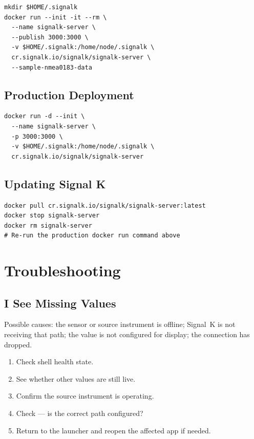 \begin{lstlisting}
mkdir $HOME/.signalk
docker run --init -it --rm \
  --name signalk-server \
  --publish 3000:3000 \
  -v $HOME/.signalk:/home/node/.signalk \
  cr.signalk.io/signalk/signalk-server \
  --sample-nmea0183-data
\end{lstlisting}

\section{Production Deployment}

\begin{lstlisting}
docker run -d --init \
  --name signalk-server \
  -p 3000:3000 \
  -v $HOME/.signalk:/home/node/.signalk \
  cr.signalk.io/signalk/signalk-server
\end{lstlisting}

\section{Updating Signal K}

\begin{lstlisting}
docker pull cr.signalk.io/signalk/signalk-server:latest
docker stop signalk-server
docker rm signalk-server
# Re-run the production docker run command above
\end{lstlisting}

\chapter{Troubleshooting}
\label{ch:troubleshooting}

\section{I See Missing Values}

Possible causes: the sensor or source instrument is offline; Signal~K is not
receiving that path; the value is not configured for display; the connection has
dropped.

\begin{enumerate}
  \item Check shell health state.
  \item See whether other values are still live.
  \item Confirm the source instrument is operating.
  \item Check  --- is the correct path configured?
  \item Return to the launcher and reopen the affected app if needed.
\end{enumerate}

